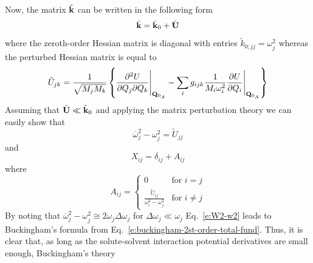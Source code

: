 \documentclass[a4paper,titlepage,twoside,fleqn,12pt]{book}
\newcommand{\fderiv}[2]{\ensuremath{
    \frac{\partial #1}{\partial #2}}}
\newcommand{\sderivd}[3]{\ensuremath{
    \frac{\partial^2 #1}{\partial #2 \partial #3}
    }}
\begin{document}
\begin{refsection}
Now, 
the matrix $\tilde{\bf k}$ can be written
in the following form
%
\begin{equation} \label{e:jeden}
 \tilde{\bf k} = \tilde{\bf k}_0 + \tilde{\bf U}
\end{equation}
%
where the zeroth\hyp{}order Hessian matrix is diagonal
with entries $\tilde{k}_{0;jj}=\omega_j^2$ whereas
the perturbed Hessian matrix is equal to
%
\begin{equation}  \label{e:trzybulak}
 \tilde{U}_{jk} = \frac{1}{\sqrt{M_jM_k}} \left\{
            \sderivd{U}{Q_j}{Q_k}  \Bigg|_{{\bf Q}_{0_A}} 
           - \sum_i g_{ijk} \frac{1}{M_i\omega_i^2}\fderiv{U}{Q_i} \Bigg|_{{\bf Q}_{0_A}} 
           \right\}
\end{equation}
%
Assuming that $\tilde{\bf U}\ll \tilde{\bf k}_0$ and applying the
matrix perturbation theory we can easily show that
%
\begin{equation} \label{e:W2-w2}
 \overline{\omega}_j^2 - {\omega}_j^2 = 
 \tilde{U}_{jj}
\end{equation}
%
and
%
\begin{equation}
 X_{ij} = \delta_{ij} + A_{ij}
\end{equation}
%
where
%
\begin{equation}
 A_{ij} = 
\left\{\begin{matrix}
0 &\text{for $i=j$}\\ 
\frac{\tilde{U}_{ij}}{\omega_i^2-\omega_j^2} &\text{for $i\ne j$}
\end{matrix}\right.
\end{equation}
%
By noting that $\overline{\omega}_j^2 - {\omega}_j^2 \cong 2\omega_j\Delta\omega_j$
for $\Delta\omega_j\ll \omega_j$ Eq.~\eqref{e:W2-w2} leads
to Buckingham's formula from Eq.~\eqref{e:buckingham-2st-order-total-fund}.
Thus, it is clear that, as long as the solute\hyp{}solvent
interaction potential derivatives are small enough, Buckingham's theory

\end{refsection}
\end{document}

